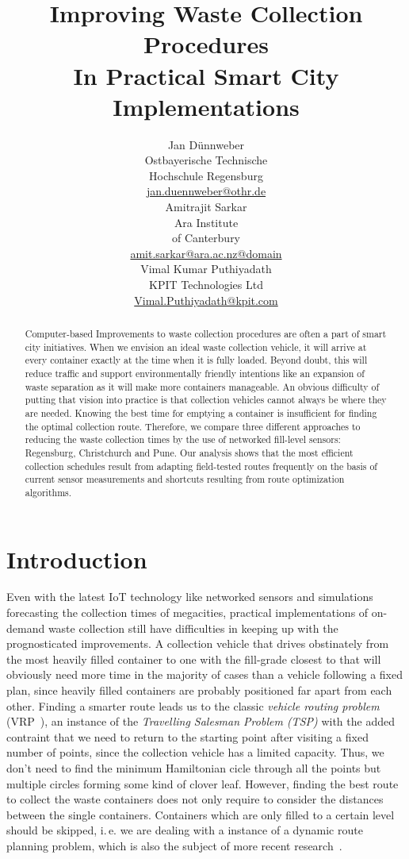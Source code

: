 \documentclass[10pt]{article}
\title{Improving Waste Collection Procedures \\ In Practical Smart City Implementations}
\author{
  Jan D{\"u}nnweber  \\
  Ostbayerische Technische \\ Hochschule Regensburg \\
  {\underline{ jan.duennweber@othr.de} }\\\And 
  Amitrajit Sarkar \\
 Ara Institute \\ of Canterbury \\
  {\underline{amit.sarkar@ara.ac.nz@domain}} \\\And
  Vimal Kumar Puthiyadath \\
 KPIT Technologies Ltd \\
  {\underline{Vimal.Puthiyadath@kpit.com}} 
  }
\date{}
\begin{document}
\maketitle
\begin{abstract}
Computer-based Improvements to waste collection procedures are often a part of smart city 
initiatives. When we envision an ideal waste collection vehicle, it will arrive at every
container exactly at the time when it is fully loaded. Beyond doubt, this will 
reduce traffic and support environmentally friendly intentions like an expansion 
of waste separation as it will make more containers manageable. 
An obvious difficulty of putting that vision into practice is that  
collection vehicles cannot always be where they are needed. 
Knowing the best time for emptying a container is insufficient for 
finding the optimal collection route.
Therefore, we compare three different approaches to reducing the waste collection
times by the use of networked fill-level sensors: Regensburg,
Christchurch and Pune. Our analysis shows that the most efficient collection schedules 
result from adapting field-tested routes frequently on the basis of 
current sensor measurements and shortcuts resulting from route 
optimization algorithms.
\end{abstract}

\section{Introduction}
Even with the latest IoT technology like networked sensors and simulations
forecasting the collection times of megacities, practical implementations of 
on-demand waste collection still have difficulties in keeping up with the 
prognosticated improvements.
A collection vehicle that drives obstinately from the most heavily filled 
container to one with the fill-grade closest to that will obviously need 
more time in the majority of cases than a vehicle following a fixed plan, 
since heavily filled containers are probably positioned far apart from 
each other. Finding a smarter route leads us to the classic 
{\it vehicle routing problem} (VRP~\cite{Dantzig59}), an instance of the 
{\it Travelling Salesman Problem (TSP)} with the added contraint that we 
need to return to the starting point after visiting a fixed number of points, 
since the collection vehicle has a limited capacity. 
Thus, we don't need to find the minimum Hamiltonian
cicle through all the points but multiple circles forming some kind of
clover leaf. However, finding the best route to collect the waste 
containers does not only require to consider the distances between 
the single containers. Containers which are only filled to a certain level should
be skipped, i.\,e. we are dealing with a instance of a dynamic route 
planning problem, which is also the subject of more recent 
research~\cite{Chen16}.
\end{document}
